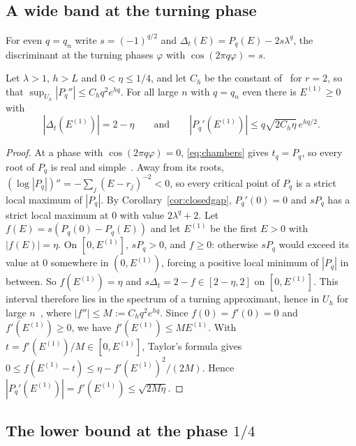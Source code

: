 \subsection{A wide band at the turning phase}

For even $q=q_n$ write $s=(-1)^{q/2}$ and $\Delta_t(E)=P_q(E)-2s\lambda^q$, the discriminant at the turning phases $\varphi$ with $\cos(2\pi q\varphi)=s$.

\begin{proposition}\label{prop:wideband}
Let $\lambda>1$, $h>L$ and $0<\eta\le1/4$, and let $C_h$ be the constant of~\cite[Proposition~3.3(2)]{DMamo} for $r=2$, so that $\sup_{U_h}|P_q''|\le C_hq^2e^{hq}$. For all large $n$ with $q=q_n$ even there is $E^{(1)}\ge0$ with
\[
|\Delta_t(E^{(1)})|=2-\eta\qquad\text{and}\qquad|P_q'(E^{(1)})|\le q\sqrt{2C_h\eta}\,e^{hq/2}.
\]
\end{proposition}

\begin{proof}
At a phase with $\cos(2\pi q\varphi)=0$, \eqref{eq:chambers} gives $t_q=P_q$, so every root of $P_q$ is real and simple~\cite[Lemma~5.3]{DMuniv}. Away from its roots, $(\log|P_q|)''=-\sum_j(E-r_j)^{-2}<0$, so every critical point of $P_q$ is a strict local maximum of $|P_q|$. By Corollary~\ref{cor:closedgap}, $P_q'(0)=0$ and $sP_q$ has a strict local maximum at $0$ with value $2\lambda^q+2$. Let $f(E)=s(P_q(0)-P_q(E))$ and let $E^{(1)}$ be the first $E>0$ with $|f(E)|=\eta$. On $[0,E^{(1)}]$, $sP_q>0$, and $f\ge0$: otherwise $sP_q$ would exceed its value at $0$ somewhere in $(0,E^{(1)})$, forcing a positive local minimum of $|P_q|$ in between. So $f(E^{(1)})=\eta$ and $s\Delta_t=2-f\in[2-\eta,2]$ on $[0,E^{(1)}]$. This interval therefore lies in the spectrum of a turning approximant, hence in $U_h$ for large $n$~\cite[Lemma~2.6]{DMamo}, where $|f''|\le M:=C_hq^2e^{hq}$. Since $f(0)=f'(0)=0$ and $f'(E^{(1)})\ge0$, we have $f'(E^{(1)})\le ME^{(1)}$. With $t=f'(E^{(1)})/M\in[0,E^{(1)}]$, Taylor's formula gives $0\le f(E^{(1)}-t)\le\eta-f'(E^{(1)})^2/(2M)$. Hence $|P_q'(E^{(1)})|=f'(E^{(1)})\le\sqrt{2M\eta}$.
\end{proof}

\subsection{The lower bound at the phase \texorpdfstring{$1/4$}{1/4}}

